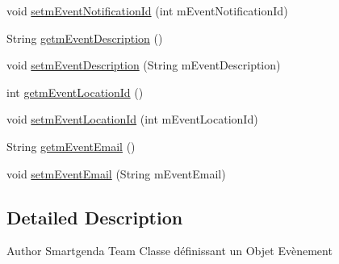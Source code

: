 \begin{DoxyCompactItemize}
\item 
void \hyperlink{classcom_1_1agenda_1_1ter_1_1model_1_1_event_aab4f3e7680802a36cbf1726df52e4f97}{setm\-Event\-Notification\-Id} (int m\-Event\-Notification\-Id)
\item 
String \hyperlink{classcom_1_1agenda_1_1ter_1_1model_1_1_event_ad1548adcc58c37e31a2ee9ccde54a6ca}{getm\-Event\-Description} ()
\item 
void \hyperlink{classcom_1_1agenda_1_1ter_1_1model_1_1_event_a07a71c19cfc5d77196edfda101b2f742}{setm\-Event\-Description} (String m\-Event\-Description)
\item 
int \hyperlink{classcom_1_1agenda_1_1ter_1_1model_1_1_event_afd9bf501c69fec443e7d2e0168c95595}{getm\-Event\-Location\-Id} ()
\item 
void \hyperlink{classcom_1_1agenda_1_1ter_1_1model_1_1_event_a139041ee98f0a0b1a6196edbc8171f91}{setm\-Event\-Location\-Id} (int m\-Event\-Location\-Id)
\item 
String \hyperlink{classcom_1_1agenda_1_1ter_1_1model_1_1_event_a8e3e2ccf05791cd0557dd083f3b761e1}{getm\-Event\-Email} ()
\item 
void \hyperlink{classcom_1_1agenda_1_1ter_1_1model_1_1_event_a78b42027190537f8f2f2fb0883f3f8cf}{setm\-Event\-Email} (String m\-Event\-Email)
\end{DoxyCompactItemize}


\subsection{Detailed Description}
\begin{DoxyAuthor}{Author}
Smartgenda Team Classe définissant un Objet Evènement 
\end{DoxyAuthor}


